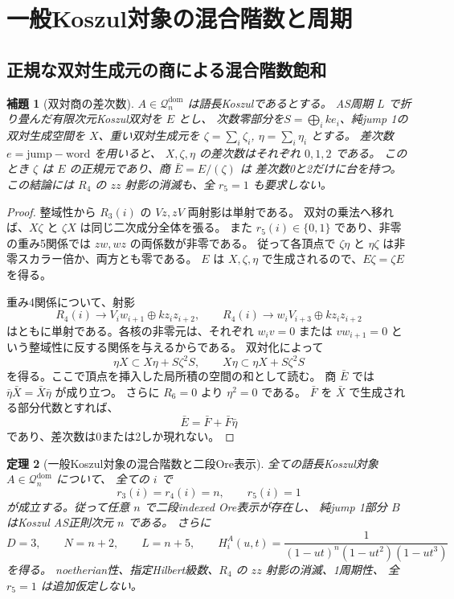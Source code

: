 \documentclass[11pt,a4paper]{ltjsarticle}
\newtheorem{theorem}{定理}[section]
\newtheorem{lemma}[theorem]{補題}
\theoremstyle{definition}
\begin{document}
\section{一般Koszul対象の混合階数と周期}\label{sec:general-koszul}
\subsection{正規な双対生成元の商による混合階数飽和}

\begin{lemma}[双対商の差次数]
\label{knd:lem:dual-quotient-support}
$A\in\mathcal Q_n^{\mathrm{dom}}$ は語長Koszulであるとする。
AS周期 $L$ で折り畳んだ有限次元Koszul双対を $E$ とし、
次数零部分を$S=\bigoplus_i ke_i$、純jump 1の双対生成空間を $X$、重い双対生成元を
$\zeta=\sum_i\zeta_i$, $\eta=\sum_i\eta_i$ とする。
差次数 $e=\mathrm{jump}-\mathrm{word}$ を用いると、
$X,\zeta,\eta$ の差次数はそれぞれ $0,1,2$ である。
このとき $\zeta$ は $E$ の正規元であり、商 $\bar E=E/(\zeta)$ は
差次数0と2だけに台を持つ。
この結論には $R_4$ の $zz$ 射影の消滅も、全 $r_5=1$ も要求しない。
\end{lemma}

\begin{proof}
整域性から $R_3(i)$ の $Vz,zV$ 両射影は単射である。
双対の乗法へ移れば、$X\zeta$ と $\zeta X$ は同じ二次成分全体を張る。
また $r_5(i)\in\{0,1\}$ であり、非零の重み5関係では $zw,wz$ の両係数が非零である。
従って各頂点で $\zeta\eta$ と $\eta\zeta$ は非零スカラー倍か、両方とも零である。
$E$ は $X,\zeta,\eta$ で生成されるので、$E\zeta=\zeta E$ を得る。

重み4関係について、射影
\[
 R_4(i)\longrightarrow V_iw_{i+1}\oplus kz_iz_{i+2},
 \qquad
 R_4(i)\longrightarrow w_iV_{i+3}\oplus kz_iz_{i+2}
\]
はともに単射である。各核の非零元は、それぞれ $w_iv=0$ または $vw_{i+1}=0$
という整域性に反する関係を与えるからである。
双対化によって
\[
 \eta X\subset X\eta+S\zeta^2S,
 \qquad X\eta\subset\eta X+S\zeta^2S
\]
を得る。ここで頂点を挿入した局所積の空間の和として読む。
商 $\bar E$ では $\bar\eta\bar X=\bar X\bar\eta$ が成り立つ。
さらに $R_6=0$ より $\eta^2=0$ である。
$\bar F$ を $\bar X$ で生成される部分代数とすれば、
\[
 \bar E=\bar F+\bar F\bar\eta
\]
であり、差次数は0または2しか現れない。
\end{proof}

\begin{theorem}[一般Koszul対象の混合階数と二段Ore表示]
\label{knd:thm:koszul-ore}
全ての語長Koszul対象 $A\in\mathcal Q_n^{\mathrm{dom}}$ について、
全ての $i$ で
\[
 r_3(i)=r_4(i)=n,\qquad r_5(i)=1
\]
が成立する。従って任意 $n$ で二段indexed Ore表示が存在し、
純jump 1部分 $B$ はKoszul AS正則次元 $n$ である。
さらに
\[
 D=3,\qquad N=n+2,\qquad L=n+5,\qquad
 H_i^A(u,t)=\frac1{(1-ut)^n(1-ut^2)(1-ut^3)}
\]
を得る。
noetherian性、指定Hilbert級数、$R_4$ の $zz$ 射影の消滅、1周期性、
全 $r_5=1$ は追加仮定しない。
\end{theorem}
\end{document}
